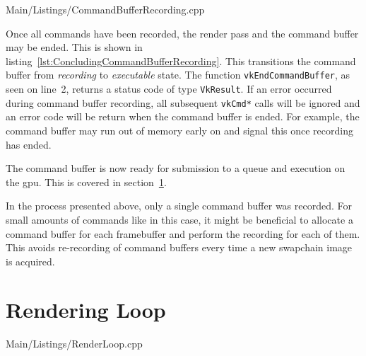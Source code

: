       
      {Main/Listings/CommandBufferRecording.cpp}

      Once all commands have been recorded, the render pass and the command buffer may be ended.
      This is shown in listing~\ref{lst:ConcludingCommandBufferRecording}.
      This transitions the command buffer from \textit{recording} to \textit{executable} state.
      The function \lstinline{vkEndCommandBuffer}, as seen on line~2, returns a status code of type \lstinline{VkResult}.
      If an error occurred during command buffer recording, all subsequent \lstinline{vkCmd*} calls will be ignored and an error code will be return when the command buffer is ended.
      For example, the command buffer may run out of memory early on and signal this once recording has ended.

      The command buffer is now ready for submission to a queue and execution on the \gls{gpu}.
      This is covered in section~\ref{sec:RenderLoop}.

      In the process presented above, only a single command buffer was recorded.
      For small amounts of commands like in this case, it might be beneficial to allocate a command buffer for each framebuffer and perform the recording for each of them.
      This avoids re-recording of command buffers every time a new swapchain image is acquired.


  \section{Rendering Loop}
  \label{sec:RenderLoop}
    \tbd

    
    {Main/Listings/RenderLoop.cpp}

